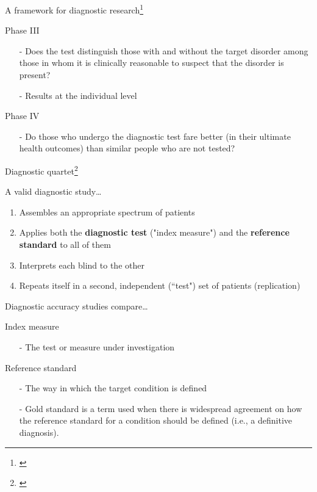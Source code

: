 \documentclass{beamer}
\begin{document}
\begin{frame}{A framework for diagnostic research\footnote{\tiny{\citet{Sackett2002a}}}}
	\begin{block}{Phase III}
		\begin{itemize}
		\item[-]  Does the test distinguish those with and without the target disorder among those in whom it is clinically reasonable to suspect that the disorder is present?
		\item[-]  Results at the individual level
		\end{itemize}
	\end{block}
	
	\begin{block}{Phase IV}
		\begin{itemize}
		\item[-] Do those who undergo the diagnostic test fare better (in their ultimate health outcomes) than similar people who are not tested?
		\end{itemize}
	\end{block}
\end{frame}

\begin{frame}{Diagnostic quartet\footnote{\tiny{\citet[p. 275]{Haynes2006}}}}
	\begin{block}{A valid diagnostic study\dots}
		\begin{enumerate}
		\item Assembles an appropriate spectrum of patients
		\item Applies both the \textbf{diagnostic test} ("index measure") and the \textbf{reference standard} to all of them
		\item Interprets each blind to the other
		\item Repeats itself in a second, independent (``test") set of patients (replication)
		\end{enumerate}
	\end{block}
\end{frame}

\begin{frame}{Diagnostic accuracy studies compare\dots}
	\begin{block}{Index measure}
		\begin{itemize}
		\item[-]  The test or measure under investigation
		\end{itemize}
	\end{block}
	
	\begin{block}{Reference standard}
		\begin{itemize}
		\item[-] The way in which the target condition is defined
		\item[-] \alert{Gold standard} is a term used when there is widespread agreement on how the reference standard for a condition should be defined (i.e., a definitive diagnosis).
		\end{itemize}
	\end{block}
\end{frame}
\end{document}

